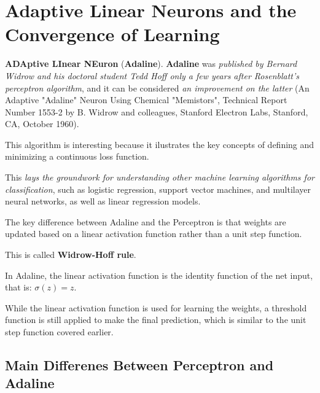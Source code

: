 \documentclass[../machine_learning_scikit.tex]{subfiles}
\begin{document}
    \section{Adaptive Linear Neurons and the Convergence of Learning}

    \textbf{ADAptive LInear NEuron} (\textbf{Adaline}). \textbf{Adaline} was \textit{published by Bernard Widrow and his doctoral student Tedd Hoff only a few years after Rosenblatt's perceptron algorithm}, and it can be considered \textit{an improvement on the latter} (An Adaptive "Adaline" Neuron Using Chemical "Memistors", Technical Report Number 1553-2 by B. Widrow and colleagues, Stanford Electron Labs, Stanford, CA, October 1960).

    This algorithm is interesting because it ilustrates the key concepts of defining and minimizing a continuous loss function.

    \begin{obs}
        This \textit{lays the groundwork for understanding other machine learning algorithms for classification}, such as logistic regression, support vector machines, and multilayer neural networks, as well as linear regression models.
    \end{obs}

    \begin{idea}
        The key difference between Adaline and the Perceptron is that weights are updated based on a linear activation function rather than a unit step function.

        This is called \textbf{Widrow-Hoff rule}.
    \end{idea}

    In Adaline, the linear activation function is the identity function of the net input, that is: $\sigma(z)=z$.

    \begin{obs}
        While the linear activation function is used for learning the weights, a threshold function is still applied to make the final prediction, which is similar to the unit step function covered earlier.
    \end{obs}

    \subsection{Main Differenes Between Perceptron and Adaline}
\end{document}
